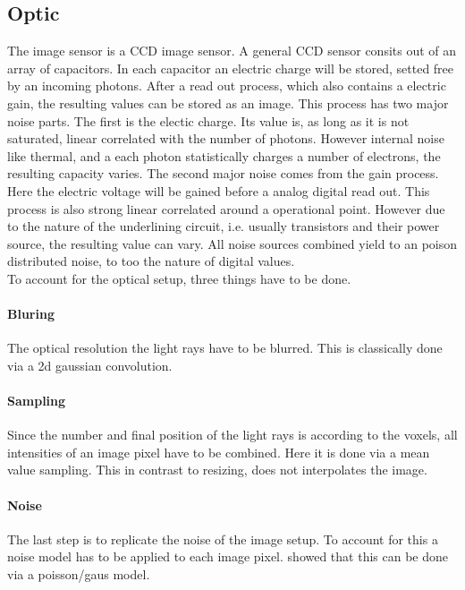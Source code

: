 \subsection{Optic}
\label{sec:ccdOptic}
% 
The image sensor is a \ac{CCD} image sensor.
A general \ac{CCD} sensor consits out of an array of capacitors.
In each capacitor an electric charge will be stored, setted free by an incoming photons.
After a read out process, which also contains a electric gain, the resulting values can be stored as an image.
This process has two major noise parts. The first is the electic charge.
Its value is, as long as it is not saturated, linear correlated with the number of photons.
However internal noise like thermal, and a each photon statistically charges a number of electrons, the resulting capacity varies.
The second major noise comes from the gain process.
Here the electric voltage will be gained before a analog digital read out.
This process is also strong linear correlated around a operational point.
However due to the nature of the underlining circuit, i.e. usually transistors and their power source, the resulting value can vary.
All noise sources combined yield to an poison distributed noise, to too the nature of digital values.
%
\\
%
To account for the optical setup, three things have to be done.
\paragraph{Bluring}
The optical resolution the light rays have to be blurred.
This is classically done via a 2d gaussian convolution.
\paragraph{Sampling}
Since the number and final position of the light rays is according to the voxels, all intensities of an image pixel have to be combined.
Here it is done via a mean value sampling.
This in contrast to resizing, does not interpolates the image.
% 
\paragraph{Noise}
The last step is to replicate the noise of the image setup. To account for this a noise model has to be applied to each image pixel. \cite{Wiese:887678} showed that this can be done via a poisson/gaus model.
% 
% 
% 
